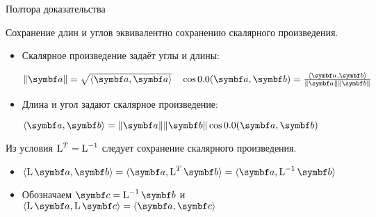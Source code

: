 \begin{frame}{Полтора доказательства}


Сохранение длин и углов эквивалентно сохранению скалярного произведения.

\pause

\begin{itemize}[<+->]
    
    \item Скалярное произведение задаёт углы и длины:

    $\norm{\ba} = \sqrt{\langle \ba, \ba\rangle} \quad \cos\angle (\ba, \bb)= \frac{\langle \ba, \bb\rangle} {\norm{\ba} \norm{\bb}}$

    \item Длина и угол задают скалярное произведение:

    $\langle \ba, \bb \rangle = \norm{\ba} \norm{\bb} \cos \angle (\ba, \bb)$
    
\end{itemize}

\pause

Из условия $\operatorname{L}^T = \operatorname{L}^{-1}$ следует сохранение скалярного произведения.

\begin{itemize}[<+->]

\item $\langle \LL \ba, \bb \rangle = \langle \ba, \LL^T \bb \rangle= \langle \ba, \LL^{-1}\bb \rangle$

\item Обозначаем $\bc = \LL^{-1} \bb$ и $\langle \LL \ba, \LL \bc \rangle = \langle \ba, \bc \rangle$
\end{itemize}


\end{frame}

